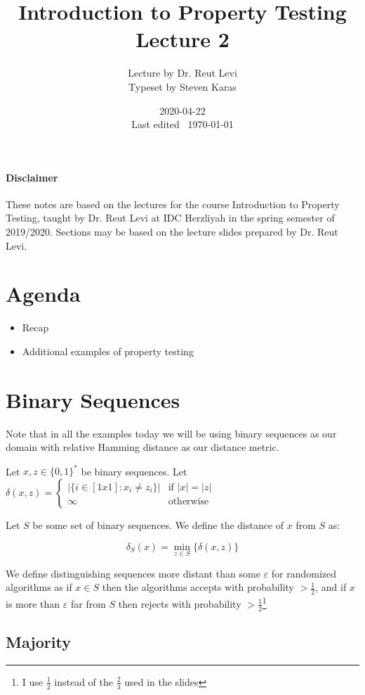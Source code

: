\documentclass{idc_msc}
\title{Introduction to Property Testing \\\large Lecture 2}
\date{2020-04-22 \\ Last edited \currenttime\ \today}
\author{Lecture by Dr. Reut Levi\\Typeset by Steven Karas}
\begin{document}
\nocite{goldreich2017introduction}

\paragraph{Disclaimer}

These notes are based on the lectures for the course Introduction to Property Testing, taught by Dr. Reut Levi at IDC Herzliyah in the spring semester of 2019/2020.
Sections may be based on the lecture slides prepared by Dr. Reut Levi.

\section{Agenda}

  \begin{itemize}
    \item Recap
    \item Additional examples of property testing
  \end{itemize}

\section{Binary Sequences}

Note that in all the examples today we will be using binary sequences as our domain with relative Hamming distance as our distance metric.

Let \(x,z \in {\{0,1\}}^{*}\) be binary sequences.
Let \(\delta(x,z) = \begin{cases}|\{i \in [1x1] : x_i \ne z_i\}| & \textrm{if } |x| = |z| \\ \infty & \textrm{otherwise}\end{cases}\)

Let \(S\) be some set of binary sequences.
We define the distance of \(x\) from \(S\) as:

\[
  \delta_S(x) = \min_{z \in S} \{\delta(x,z)\}
\]

We define distinguishing sequences more distant than some \(\varepsilon\) for randomized algorithms as if \(x \in S\) then the algorithms accepts with probability \(> \frac{1}{2}\), and if \(x\) is more than \(\varepsilon\) far from \(S\) then rejects with probability \(> \frac{1}{2}\)\footnote{I use \(\frac{1}{2}\) instead of the \(\frac{2}{3}\) used in the slides}

\subsection{Majority}
\end{document}
